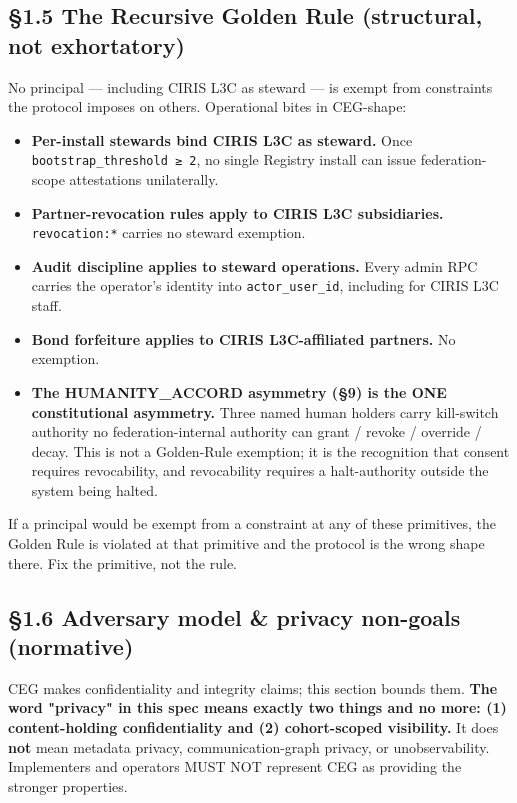 \documentclass[11pt]{article}
\begin{document}
\subsection*{§1.5 The Recursive Golden Rule (structural, not exhortatory)}


No principal — including CIRIS L3C as steward — is exempt from constraints the protocol imposes on others. Operational bites in CEG-shape:


\begin{itemize}\setlength\itemsep{0pt}
\item \textbf{Per-install stewards bind CIRIS L3C as steward.} Once \texttt{bootstrap\_threshold ≥ 2}, no single Registry install can issue federation-scope attestations unilaterally.
\item \textbf{Partner-revocation rules apply to CIRIS L3C subsidiaries.} \texttt{revocation:*} carries no steward exemption.
\item \textbf{Audit discipline applies to steward operations.} Every admin RPC carries the operator's identity into \texttt{actor\_user\_id}, including for CIRIS L3C staff.
\item \textbf{Bond forfeiture applies to CIRIS L3C-affiliated partners.} No exemption.
\item \textbf{The HUMANITY\_ACCORD asymmetry (§9) is the ONE constitutional asymmetry.} Three named human holders carry kill-switch authority no federation-internal authority can grant / revoke / override / decay. This is not a Golden-Rule exemption; it is the recognition that consent requires revocability, and revocability requires a halt-authority outside the system being halted.
\end{itemize}


If a principal would be exempt from a constraint at any of these primitives, the Golden Rule is violated at that primitive and the protocol is the wrong shape there. Fix the primitive, not the rule.


\subsection*{§1.6 Adversary model \& privacy non-goals (normative)}


CEG makes confidentiality and integrity claims; this section bounds them. \textbf{The word "privacy" in this spec means exactly two things and no more: (1) content-holding confidentiality and (2) cohort-scoped visibility.} It does \textbf{not} mean metadata privacy, communication-graph privacy, or unobservability. Implementers and operators MUST NOT represent CEG as providing the stronger properties.
\end{document}
